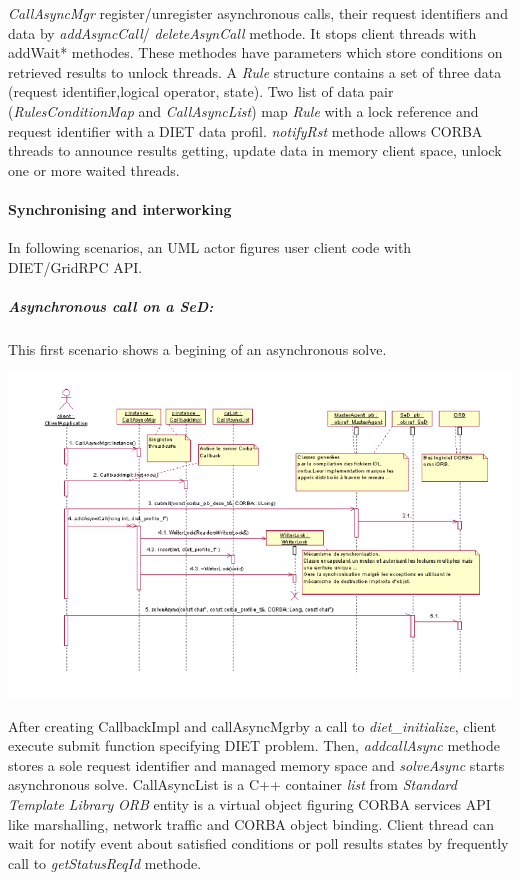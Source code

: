   \emph{CallAsyncMgr} register/unregister asynchronous calls, their request
  identifiers and data by \emph{addAsyncCall}/ \emph{deleteAsynCall} methode.
  It stops client threads with addWait* methodes. These methodes have
  parameters which store conditions on retrieved results to unlock threads.
  A \emph{Rule} structure contains a set of three data (request identifier,logical operator, state).
  Two list of data pair (\emph{RulesConditionMap} and \emph{CallAsyncList}) map \emph{Rule} with a
  lock reference and request identifier with a DIET data
  profil. \emph{notifyRst} methode allows CORBA threads to announce results getting,
  update data in memory client space, unlock one or more waited threads.

  \paragraph{Synchronising and interworking}
  In following scenarios, an UML actor figures user client code with DIET/GridRPC API.

  \subparagraph{Asynchronous call on a SeD:}
  This first scenario shows a begining of an asynchronous solve.

  \hspace{-0.9 in}
  \includegraphics{./fig/CallAsyncSequenceDiagram}

  After creating CallbackImpl and callAsyncMgrby a call to
  \emph{diet\_initialize}, client execute submit function specifying DIET
  problem. Then, \emph{addcallAsync} methode stores a sole request
  identifier and managed memory space and \emph{solveAsync} starts
  asynchronous solve.
  CallAsyncList is a C++ container \emph{list} from \emph{Standard Template Library}
  \emph{ORB} entity is a virtual object figuring CORBA services API like
  marshalling, network traffic and CORBA object binding.
  Client thread can wait for notify event about satisfied conditions or
  poll results states by frequently call to \emph{getStatusReqId} methode.

